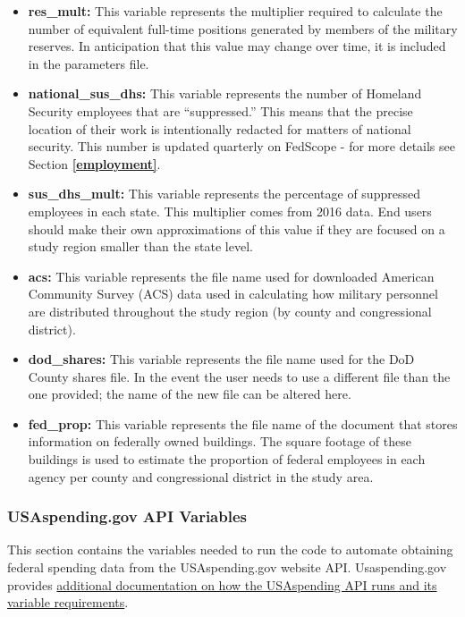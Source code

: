 \documentclass[
]{book}
\providecommand{\tightlist}{%
  \setlength{\itemsep}{0pt}\setlength{\parskip}{0pt}}
\begin{document}
\begin{itemize}
\tightlist
\item
  \textbf{res\_mult:} This variable represents the multiplier required to calculate the number of equivalent full-time positions generated by members of the military reserves. In anticipation that this value may change over time, it is included in the parameters file.\\
\item
  \textbf{national\_sus\_dhs:} This variable represents the number of Homeland Security employees that are ``suppressed.'' This means that the precise location of their work is intentionally redacted for matters of national security. This number is updated quarterly on FedScope - for more details see Section \textbf{\ref{employment}}.
\item
  \textbf{sus\_dhs\_mult:} This variable represents the percentage of suppressed employees in each state. This multiplier comes from 2016 data. End users should make their own approximations of this value if they are focused on a study region smaller than the state level.
\item
  \textbf{acs:} This variable represents the file name used for downloaded American Community Survey (ACS) data used in calculating how military personnel are distributed throughout the study region (by county and congressional district).\\
\item
  \textbf{dod\_shares:} This variable represents the file name used for the DoD County shares file. In the event the user needs to use a different file than the one provided; the name of the new file can be altered here.\\
\item
  \textbf{fed\_prop:} This variable represents the file name of the document that stores information on federally owned buildings. The square footage of these buildings is used to estimate the proportion of federal employees in each agency per county and congressional district in the study area.
\end{itemize}

\hypertarget{usa-api}{%
\subsubsection{USAspending.gov API Variables}\label{usa-api}}

This section contains the variables needed to run the code to automate obtaining federal spending data from the USAspending.gov website API. Usaspending.gov provides \href{https://github.com/fedspendingtransparency/usaspending-api/blob/master/usaspending_api/api_contracts/contracts/v2/bulk_download/awards.md}{additional documentation on how the USAspending API runs and its variable requirements}.
\end{document}
